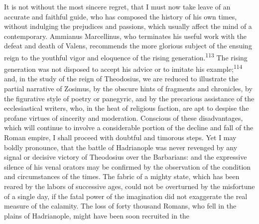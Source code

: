 


It is not without the most sincere regret, that I must now take
leave of an accurate and faithful guide, who has composed the
history of his own times, without indulging the prejudices and
passions, which usually affect the mind of a contemporary.
Ammianus Marcellinus, who terminates his useful work with the
defeat and death of Valens, recommends the more glorious subject
of the ensuing reign to the youthful vigor and eloquence of the
rising generation.\textsuperscript{113} The rising generation was not disposed to
accept his advice or to imitate his example;\textsuperscript{114} and, in the
study of the reign of Theodosius, we are reduced to illustrate
the partial narrative of Zosimus, by the obscure hints of
fragments and chronicles, by the figurative style of poetry or
panegyric, and by the precarious assistance of the ecclesiastical
writers, who, in the heat of religious faction, are apt to
despise the profane virtues of sincerity and moderation.
Conscious of these disadvantages, which will continue to involve
a considerable portion of the decline and fall of the Roman
empire, I shall proceed with doubtful and timorous steps. Yet I
may boldly pronounce, that the battle of Hadrianople was never
revenged by any signal or decisive victory of Theodosius over the
Barbarians: and the expressive silence of his venal orators may
be confirmed by the observation of the condition and
circumstances of the times. The fabric of a mighty state, which
has been reared by the labors of successive ages, could not be
overturned by the misfortune of a single day, if the fatal power
of the imagination did not exaggerate the real measure of the
calamity. The loss of forty thousand Romans, who fell in the
plains of Hadrianople, might have been soon recruited in the
